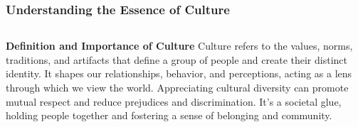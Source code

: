 \documentclass[5pt]{beamer}
\begin{document}
\begin{frame}
\frametitle{Understanding the Essence of Culture}
\begin{columns}
\begin{column}{0.7\textwidth}
\begin{block}{\textbf{Definition and Importance of Culture}}
Culture refers to the values, norms, traditions, and artifacts that define a group of people and create their distinct identity. It shapes our relationships, behavior, and perceptions, acting as a lens through which we view the world. Appreciating cultural diversity can promote mutual respect and reduce prejudices and discrimination. It's a societal glue, holding people together and fostering a sense of belonging and community.
\end{block}
\end{column}
\end{columns}
\end{frame}
\end{document}
